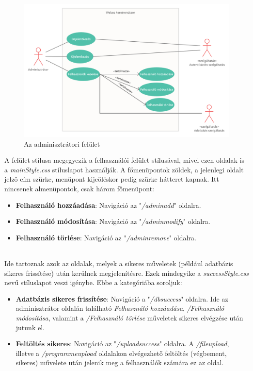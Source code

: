 \begin{figure}[h]
	\centering
		\includegraphics[width=15truecm, height=10truecm]{images/adminisztrator_use_case.png}
	\caption{Az adminisztrátori felület}
	\label{fig:adminusecase}
\end{figure}

A felület stílusa megegyezik a felhasználói felület stílusával, mivel ezen oldalak is a \textit{mainStyle.css} stíluslapot használják. A főmenüpontok zöldek, a jelenlegi oldalt jelző cím szürke, menüpont kijeöléskor pedig szürke hátteret kapnak. Itt nincsenek almenüpontok, csak három főmenüpont:

\begin{itemize}
\item{\textbf{Felhasználó hozzáadása}: Navigáció az "\textit{/adminadd}" oldalra.}
\item{\textbf{Felhasználó módosítása}: Navigáció az "\textit{/adminmodify}" oldalra.}
\item{\textbf{Felhasználó törlése}: Navigáció az "\textit{/adminremove}" oldalra.}
\end{itemize}

\\

Ide tartoznak azok az oldalak, melyek a sikeres műveletek (például adatbázis sikeres frissítése) után kerülnek megjelenítésre. Ezek mindegyike a \textit{successStyle.css} nevű stíluslapot veszi igénybe. Ebbe a kategóriába soroljuk:

\begin{itemize}
\item{\textbf{Adatbázis sikeres frissítése}: Navigáció a "\textit{/dbsuccess}" oldalra. Ide az adminisztrátor oldalán található \textit{Felhasználó hozzáadása}, \textit{/Felhasználó módosítása}, valamint a \textit{/Felhasználó törlése} műveletek sikeres elvégzése után jutunk el.}
\item{\textbf{Feltöltés sikeres}: Navigáció az "\textit{/uploadsuccess}" oldalra. A \textit{/fileupload}, illetve a \textit{/programmeupload} oldalakon elvégezhető feltöltés (végbement, sikeres) művelete után jelenik meg a felhasználók számára ez az oldal.}
\end{itemize}

